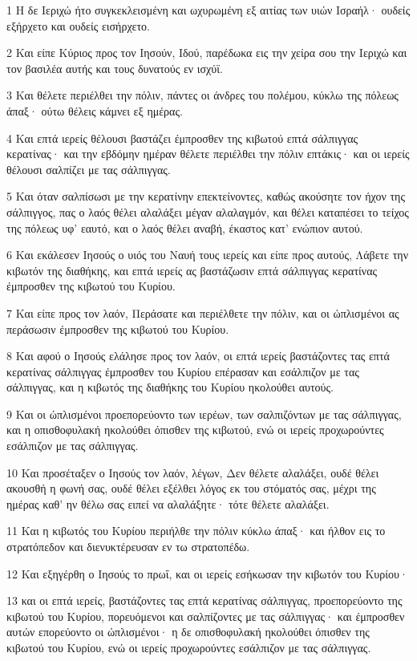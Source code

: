 \par 1 Η δε Ιεριχώ ήτο συγκεκλεισμένη και ωχυρωμένη εξ αιτίας των υιών Ισραήλ· ουδείς εξήρχετο και ουδείς εισήρχετο.
\par 2 Και είπε Κύριος προς τον Ιησούν, Ιδού, παρέδωκα εις την χείρα σου την Ιεριχώ και τον βασιλέα αυτής και τους δυνατούς εν ισχύϊ.
\par 3 Και θέλετε περιέλθει την πόλιν, πάντες οι άνδρες του πολέμου, κύκλω της πόλεως άπαξ· ούτω θέλεις κάμνει εξ ημέρας.
\par 4 Και επτά ιερείς θέλουσι βαστάζει έμπροσθεν της κιβωτού επτά σάλπιγγας κερατίνας· και την εβδόμην ημέραν θέλετε περιέλθει την πόλιν επτάκις· και οι ιερείς θέλουσι σαλπίζει με τας σάλπιγγας.
\par 5 Και όταν σαλπίσωσι με την κερατίνην επεκτείνοντες, καθώς ακούσητε τον ήχον της σάλπιγγος, πας ο λαός θέλει αλαλάξει μέγαν αλαλαγμόν, και θέλει καταπέσει το τείχος της πόλεως υφ' εαυτό, και ο λαός θέλει αναβή, έκαστος κατ' ενώπιον αυτού.
\par 6 Και εκάλεσεν Ιησούς ο υιός του Ναυή τους ιερείς και είπε προς αυτούς, Λάβετε την κιβωτόν της διαθήκης, και επτά ιερείς ας βαστάζωσιν επτά σάλπιγγας κερατίνας έμπροσθεν της κιβωτού του Κυρίου.
\par 7 Και είπε προς τον λαόν, Περάσατε και περιέλθετε την πόλιν, και οι ώπλισμένοι ας περάσωσιν έμπροσθεν της κιβωτού του Κυρίου.
\par 8 Και αφού ο Ιησούς ελάλησε προς τον λαόν, οι επτά ιερείς βαστάζοντες τας επτά κερατίνας σάλπιγγας έμπροσθεν του Κυρίου επέρασαν και εσάλπιζον με τας σάλπιγγας, και η κιβωτός της διαθήκης του Κυρίου ηκολούθει αυτούς.
\par 9 Και οι ώπλισμένοι προεπορεύοντο των ιερέων, των σαλπιζόντων με τας σάλπιγγας, και η οπισθοφυλακή ηκολούθει όπισθεν της κιβωτού, ενώ οι ιερείς προχωρούντες εσάλπιζον με τας σάλπιγγας.
\par 10 Και προσέταξεν ο Ιησούς τον λαόν, λέγων, Δεν θέλετε αλαλάξει, ουδέ θέλει ακουσθή η φωνή σας, ουδέ θέλει εξέλθει λόγος εκ του στόματός σας, μέχρι της ημέρας καθ' ην θέλω σας ειπεί να αλαλάξητε· τότε θέλετε αλαλάξει.
\par 11 Και η κιβωτός του Κυρίου περιήλθε την πόλιν κύκλω άπαξ· και ήλθον εις το στρατόπεδον και διενυκτέρευσαν εν τω στρατοπέδω.
\par 12 Και εξηγέρθη ο Ιησούς το πρωΐ, και οι ιερείς εσήκωσαν την κιβωτόν του Κυρίου·
\par 13 και οι επτά ιερείς, βαστάζοντες τας επτά κερατίνας σάλπιγγας, προεπορεύοντο της κιβωτού του Κυρίου, πορευόμενοι και σαλπίζοντες με τας σάλπιγγας· και έμπροσθεν αυτών επορεύοντο οι ώπλισμένοι· η δε οπισθοφυλακή ηκολούθει όπισθεν της κιβωτού του Κυρίου, ενώ οι ιερείς προχωρούντες εσάλπιζον με τας σάλπιγγας.

